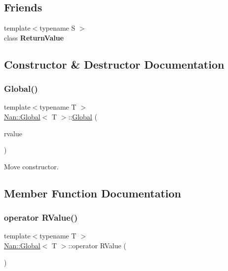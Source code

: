 \subsection*{Friends}
\begin{DoxyCompactItemize}
\item 
\mbox{\label{class_nan_1_1_global_a53f604d3d6f2dc0647df33c9979f116a}} 
{\footnotesize template$<$typename S $>$ }\\class {\bfseries Return\+Value}
\end{DoxyCompactItemize}


\subsection{Constructor \& Destructor Documentation}
\mbox{\label{class_nan_1_1_global_a333bda56d4a0c97928ab377e8accb51c}} 
\subsubsection{\texorpdfstring{Global()}{Global()}}
{\footnotesize\ttfamily template$<$typename T $>$ \\
\hyperlink{class_nan_1_1_global}{Nan\+::\+Global}$<$ T $>$\+::\hyperlink{class_nan_1_1_global}{Global} (\begin{DoxyParamCaption}\item[{R\+Value}]{rvalue }\end{DoxyParamCaption})\hspace{0.3cm}{\ttfamily [inline]}}

Move constructor. 

\subsection{Member Function Documentation}
\mbox{\label{class_nan_1_1_global_a87f389eddb5684135f0614146d6e2cbc}} 
\subsubsection{\texorpdfstring{operator R\+Value()}{operator RValue()}}
{\footnotesize\ttfamily template$<$typename T $>$ \\
\hyperlink{class_nan_1_1_global}{Nan\+::\+Global}$<$ T $>$\+::operator R\+Value (\begin{DoxyParamCaption}{ }\end{DoxyParamCaption})\hspace{0.3cm}{\ttfamily [inline]}}

